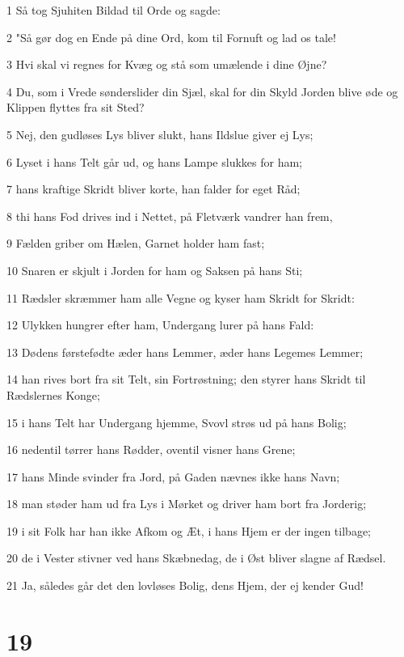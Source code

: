 \par 1 Så tog Sjuhiten Bildad til Orde og sagde:
\par 2 "Så gør dog en Ende på dine Ord, kom til Fornuft og lad os tale!
\par 3 Hvi skal vi regnes for Kvæg og stå som umælende i dine Øjne?
\par 4 Du, som i Vrede sønderslider din Sjæl, skal for din Skyld Jorden blive øde og Klippen flyttes fra sit Sted?
\par 5 Nej, den gudløses Lys bliver slukt, hans Ildslue giver ej Lys;
\par 6 Lyset i hans Telt går ud, og hans Lampe slukkes for ham;
\par 7 hans kraftige Skridt bliver korte, han falder for eget Råd;
\par 8 thi hans Fod drives ind i Nettet, på Fletværk vandrer han frem,
\par 9 Fælden griber om Hælen, Garnet holder ham fast;
\par 10 Snaren er skjult i Jorden for ham og Saksen på hans Sti;
\par 11 Rædsler skræmmer ham alle Vegne og kyser ham Skridt for Skridt:
\par 12 Ulykken hungrer efter ham, Undergang lurer på hans Fald:
\par 13 Dødens førstefødte æder hans Lemmer, æder hans Legemes Lemmer;
\par 14 han rives bort fra sit Telt, sin Fortrøstning; den styrer hans Skridt til Rædslernes Konge;
\par 15 i hans Telt har Undergang hjemme, Svovl strøs ud på hans Bolig;
\par 16 nedentil tørrer hans Rødder, oventil visner hans Grene;
\par 17 hans Minde svinder fra Jord, på Gaden nævnes ikke hans Navn;
\par 18 man støder ham ud fra Lys i Mørket og driver ham bort fra Jorderig;
\par 19 i sit Folk har han ikke Afkom og Æt, i hans Hjem er der ingen tilbage;
\par 20 de i Vester stivner ved hans Skæbnedag, de i Øst bliver slagne af Rædsel.
\par 21 Ja, således går det den lovløses Bolig, dens Hjem, der ej kender Gud!

\chapter{19}

